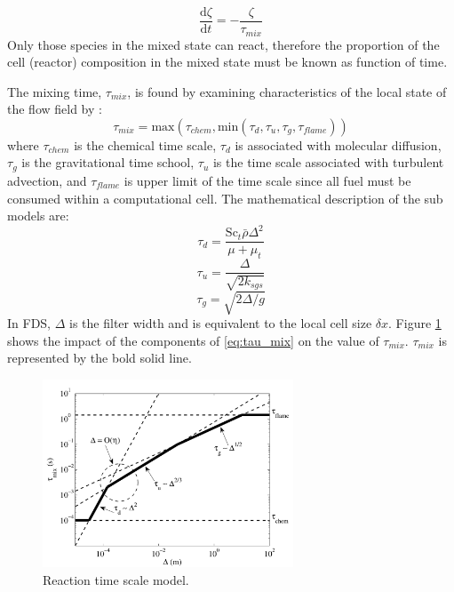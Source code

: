 \begin{equation}\label{eq:zeta}
\frac{\mbox{d}\zeta}{\mbox{d}t}=-\frac{\zeta}{\tau_{mix}}
\end{equation}     
Only those species in the mixed state can react, therefore the proportion of the cell (reactor) composition in the mixed state must be known as function of time. 

The mixing time, $\tau_{mix}$, is found by examining characteristics of the local state of the flow field by \cite{McDermott:2011}:
\begin{equation}\label{eq:tau_mix}
\tau_{mix}=\mbox{max}(\tau_{chem},\mbox{min}(\tau_{d},\tau_{u},\tau_{g},\tau_{flame}))
\end{equation}
where $\tau_{chem}$ is the chemical time scale, $\tau_{d}$ is associated with molecular diffusion, $\tau_{g}$ is the gravitational time school, $\tau_{u}$ is the time scale associated with turbulent advection, and $\tau_{flame}$ is upper limit of the time scale since all fuel must be consumed within a computational cell. The mathematical description of the sub models are:
\begin{equation}\label{eq:tau_d}
\tau_{d}=\frac{\mbox{Sc}_{t}\bar{\rho}\Delta^2}{\mu+\mu_{t}}
\end{equation}
\begin{equation}\label{eq:tau_u}
\tau_{u}=\frac{\Delta}{\sqrt{2k_{sgs}}}
\end{equation}
\begin{equation}\label{eq:tau_g}
\tau_{g}=\sqrt{2\Delta/g}
\end{equation}
In FDS, $\Delta$ is the filter width and is equivalent to the local cell size $\delta x$. Figure \ref{fig:reac_time_scale} shows the impact of the components of \ref{eq:tau_mix} on the value of $\tau_{mix}$. $\tau_{mix}$ is represented by the bold solid line.

\begin{figure}[h!]
\begin{center}
\includegraphics[height=2.2in]{FIGURES/reaction_time_scale}
\caption{\label{fig:reac_time_scale} Reaction time scale model.}
\end{center}
\end{figure}

